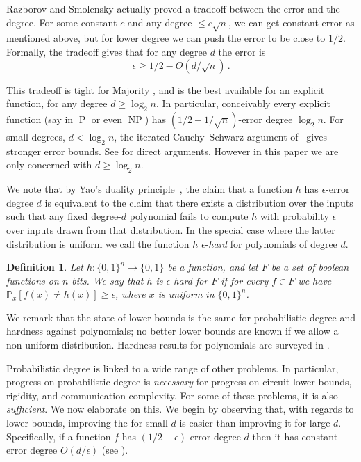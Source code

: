 \documentclass{toc}
\newtheorem{defn}[theorem]{Definition}
\DeclareMathOperator{\NP}{\mathrm{NP}}  %
\DeclareMathOperator{\PPP}{\mathrm{P}}  %
\newcommand{\zo}{\{0, 1\}}
\renewcommand{\P}{\mathbb{P}}
\newcommand{\e}{\epsilon}
\begin{document}
\medskip

Razborov and Smolensky actually proved a tradeoff between the error
and the degree.
%
%
%
%
For some constant $c$ and any degree $\le c \sqrt{n}$, %
%
%
%
%
%
%
%
we can get constant error as mentioned above,
but for lower degree we can push the error
to be close to $1/2$. Formally, the tradeoff gives that for any
degree $d$ the error is
\begin{equation}
%
%
%
\e\ge1/2- O(d/\sqrt{n})\,.\label{eq:smolensky}   %
\end{equation}
%
%
%
%

This tradeoff is tight for Majority %
\cite{Viola-L12requiresCor},  %
and is
the best available for an explicit function, for any degree $d\ge\log_{2}n$.
In particular, conceivably every explicit function (say in $\PPP$ or
even $\NP$) has %
$(1/2-1/\sqrt{n})$-error %
degree $\log_{2}n$.
%
For small degrees, $d<\log_{2}n$, the iterated Cauchy--Schwarz argument
of~\cite{BNS92} gives stronger error bounds.   %
%
%
%
%
%
%
%
See \cite{ViolaGF2,ViW-GF2,viola-FTTCS09}
for direct arguments.  %
%
However in this paper we are only concerned with $d\ge\log_{2}n$.

We note that by Yao's duality principle~\cite{DBLP:conf/focs/Yao77},
the claim that a function $h$ has $\e$-error degree $d$ is equivalent
to the claim that there exists a distribution over the inputs such
that any fixed degree-$d$ polynomial fails to compute $h$ with probability
$\e$ over inputs drawn from that distribution. In the special case
where the latter distribution is uniform we call the function $h$
$\e$-\emph{hard }for polynomials of degree $d$.
\begin{defn}
\label{def:hardness}Let $h:\zo^{n}\to\zo$ be a function, and let
$F$ be a set of boolean functions on $n$ bits. We say that $h$
is $\e$-hard for $F$ if for every $f\in F$ we have $\P_{x}[f(x)\ne h(x)]\ge\e$,
where $x$ is uniform in $\zo^{n}$.
\end{defn}

We remark that the state of lower bounds is the same for probabilistic
degree and hardness against %
polynomials; no  %
better lower bounds are
known if we allow a non-uniform distribution. Hardness results for
polynomials are surveyed in %
\cite[Chapter 1]{viola-FTTCS09}.   %

\medskip

Probabilistic degree is linked to a wide range of other problems.
In particular, progress on probabilistic degree is \emph{necessary}
for progress on circuit lower bounds, rigidity, and communication
complexity. For some of these problems, it is also \emph{sufficient}.
We now elaborate on this. We begin by observing that, with regards
to lower bounds, improving the
%
%
%
for small $d$ is easier than improving it for large $d$. Specifically,
if a function $f$ has $(1/2-\e)$-error degree $d$ then it has constant-error
degree $O(d/\e)$ (see ).
\end{document}
